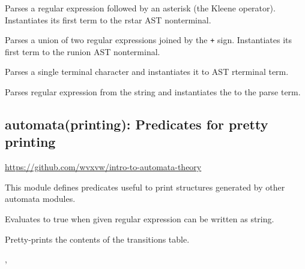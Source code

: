 \begin{description}
Parses a regular expression followed by an asterisk (the Kleene
operator). Instantiates its first term to the rstar AST nonterminal.

\begin{tags}
\end{tags}

Parses a union of two regular expressions joined by the \verb$+$ sign.
Instantiates its first term to the runion AST nonterminal.

\begin{tags}
\end{tags}

Parses a single terminal character and instantiates it to
AST rterminal term.

\begin{tags}
\end{tags}

Parses regular expression from the string  and instantiates
the  to the parse  term.

\begin{tags}
\end{tags}
\end{description}

\subsection{automata(printing): Predicates for pretty printing}

\label{sec:printing}

\begin{tags}
\url{https://github.com/wvxvw/intro-to-automata-theory}
\end{tags}

This module defines predicates useful to print structures generated by
other automata modules.\vspace{0.7cm}

\begin{description}
Evaluates to true when given regular expression  can be written
as  string.

\begin{tags}
\end{tags}

Pretty-prints the contents of the transitions table.

\begin{tags}
, 
\end{tags}
\end{description}


